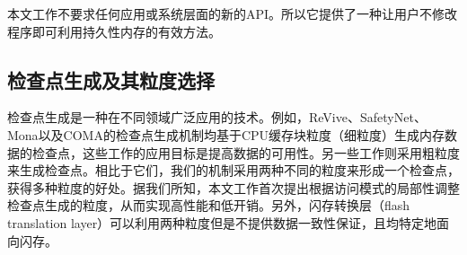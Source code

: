 
本文工作不要求任何应用或系统层面的新的API。所以它提供了一种让用户不修改程序即可利用持久性内存的有效方法。



\subsection{检查点生成及其粒度选择}
检查点生成是一种在不同领域广泛应用的技术\cite{466999, 5645453}。例如，ReVive\cite{1003567}、SafetyNet\cite{1003568}、
Mona\cite{Gao:2015:RIC}以及COMA\cite{1563035}的检查点生成机制均基于CPU缓存块粒度（细粒度）生成内存数据的检查点，这些工作的应用目标是提高数据的可用性。另一些工作\cite{6468462, Oliner:2006:CCR:1183401.1183406,
Rajachandrasekar:2014:MDC:2600212.2600713}则采用粗粒度来生成检查点。相比于它们，我们的机制采用两种不同的粒度来形成一个检查点，获得多种粒度的好处。据我们所知，本文工作首次提出根据访问模式的局部性调整检查点生成的粒度，从而实现高性能和低开销。另外，闪存转换层（flash translation layer）可以利用两种粒度\cite{Kang:2006:SFT:1176887.1176911,
Lee:2007:LBF:1275986.1275990}但是不提供数据一致性保证，且均特定地面向闪存。

